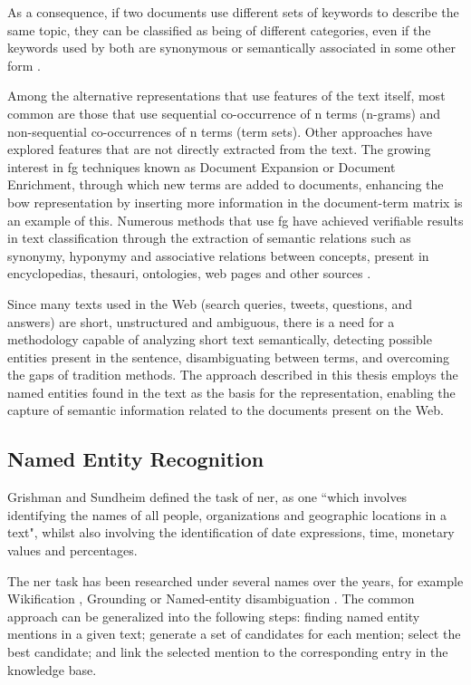 As a consequence, if two documents use different sets of keywords to describe the same topic, they can be classified as being of different categories, even if the keywords used by both are synonymous or semantically associated in some other form \cite {Hu:2009}.

Among the alternative representations that use features of the text itself, most common are those that use sequential co-occurrence of n terms (n-grams) and non-sequential co-occurrences of n terms (term sets). Other approaches have explored features that are not directly extracted from the text. The growing interest in \gls{fg} techniques known as Document Expansion or Document Enrichment, through which new terms are added to documents, enhancing the \gls{bow} representation by inserting more information in the document-term matrix \cite {Gabrilovich:2005} is an example of this. Numerous methods that use \gls{fg} have achieved verifiable results in text classification through the extraction of semantic relations such as synonymy, hyponymy and associative relations between concepts, present in encyclopedias, thesauri, ontologies, web pages and other sources \cite{Gabrilovich:2005,Gabrilovich:2006,Hu:2008,Wang:2008, Wang:2009}.

Since many texts used in the Web (search queries, tweets, questions, and answers) are short, unstructured and ambiguous, there is a need for a methodology capable of analyzing short text semantically, detecting possible entities present in the sentence, disambiguating between terms, and overcoming the gaps of tradition methods. The approach described in this thesis employs the named entities found in the text as the basis for the representation, enabling the capture of semantic information related to the documents present on the Web.


\subsection{\hspace*{3pt}Named Entity Recognition}

Grishman and  Sundheim \cite{grishman1996message} defined the task of \gls{ner}, as one ``which involves identifying the names of all people, organizations and geographic locations in a text", whilst also involving the identification of date expressions, %
time, monetary values and percentages. 

The \gls{ner} task has been researched under several names over the years, for example Wikification \cite{Ratinov:2011}, Grounding \cite{leidner2003grounding} or Named-entity disambiguation \cite{hoffart2011robust}. The common approach can be generalized into the following steps: finding named entity mentions in a given text; generate a set of candidates for each mention; select the best candidate; and link the selected mention to the corresponding entry in the knowledge base.

